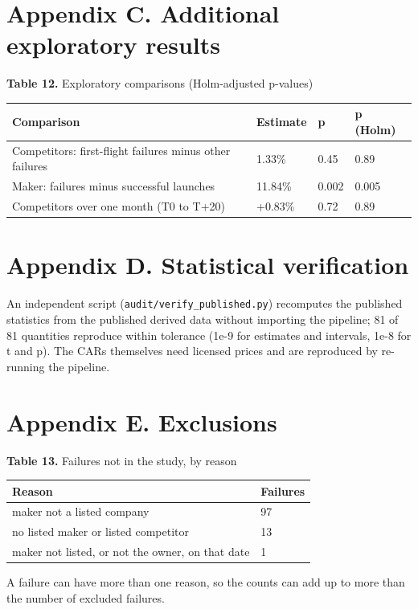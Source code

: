 \documentclass[12pt,a4paper]{article}
\begin{document}
\section*{Appendix C. Additional exploratory results}
\par\noindent\begin{minipage}{\textwidth}
\textbf{Table 12.} Exploratory comparisons (Holm-adjusted p-values)

{\small\setlength{\tabcolsep}{4pt}\begin{tabularx}{\textwidth}{Xlll}
\toprule
\textbf{Comparison} & \textbf{Estimate} & \textbf{p} & \textbf{p (Holm)} \\
\midrule
Competitors: first-flight failures minus other failures & \textminus{}1.33\% & 0.45 & 0.89 \\
Maker: failures minus successful launches & \textminus{}11.84\% & 0.002 & 0.005 \\
Competitors over one month (T0 to T+20) & +0.83\% & 0.72 & 0.89 \\
\bottomrule
\end{tabularx}}
\vspace{6pt}

\end{minipage}\par\vspace{4pt}

\section*{Appendix D. Statistical verification}
An independent script (\texttt{audit/verify\_published.py}) recomputes the published statistics from the published derived data without importing the pipeline; 81 of 81 quantities reproduce within tolerance (1e-9 for estimates and intervals, 1e-8 for t and p). The CARs themselves need licensed prices and are reproduced by re-running the pipeline.

\section*{Appendix E. Exclusions}
\par\noindent\begin{minipage}{\textwidth}
\textbf{Table 13.} Failures not in the study, by reason

{\small\setlength{\tabcolsep}{4pt}\begin{tabularx}{\textwidth}{Xl}
\toprule
\textbf{Reason} & \textbf{Failures} \\
\midrule
maker not a listed company & 97 \\
no listed maker or listed competitor & 13 \\
maker not listed, or not the owner, on that date & 1 \\
\bottomrule
\end{tabularx}}
\vspace{6pt}

A failure can have more than one reason, so the counts can add up to more than the number of excluded failures.

\end{minipage}\par\vspace{4pt}
\end{document}
